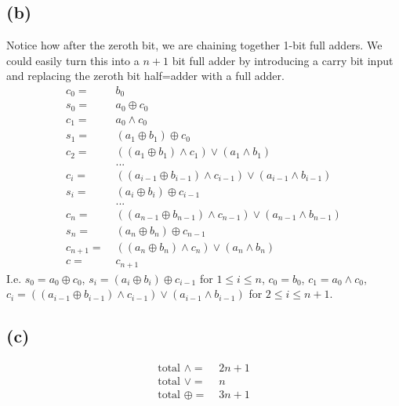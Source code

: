 \documentclass{article}
\begin{document}
\subsection{(b)}
Notice how after the zeroth bit, we are chaining together 1-bit full adders. We could easily turn this into a $n+1$ bit full adder by introducing a carry bit input and replacing the zeroth bit half=adder with a full adder.
\begin{align*}
	c_0 = \;     & b_0                                                                   \\
	s_0 = \;     & a_0 \oplus c_0                                                        \\
	c_1 = \;     & a_0 \land c_0                                                         \\
	s_1 = \;     & (a_1 \oplus b_1) \oplus c_0                                           \\
	c_2 = \;     & ((a_1 \oplus b_1) \land c_1) \lor (a_1 \land b_1)                     \\
	             & ...                                                                   \\
	c_i = \;     & ((a_{i-1} \oplus b_{i-1}) \land c_{i-1}) \lor (a_{i-1} \land b_{i-1}) \\
	s_i = \;     & (a_i \oplus b_i) \oplus c_{i-1}                                       \\
	             & ...                                                                   \\
	c_n = \;     & ((a_{n-1} \oplus b_{n-1}) \land c_{n-1}) \lor (a_{n-1} \land b_{n-1}) \\
	s_n  = \;    & (a_n \oplus b_n) \oplus c_{n-1}                                       \\
	c_{n+1} = \; & ((a_n \oplus b_n) \land c_n) \lor (a_n \land b_n)                     \\
	c = \;       & c_{n+1}
\end{align*}
I.e. $s_0 = a_0 \oplus c_0$, $s_i = (a_i \oplus b_i) \oplus c_{i-1}$ for $1 \leq i \leq n$, $c_0 = b_0$, $c_1 = a_0 \land c_0$, $c_i = ((a_{i-1} \oplus b_{i-1}) \land c_{i-1}) \lor (a_{i-1} \land b_{i-1})$ for $2 \leq i \leq n+1$.

\subsection{(c)}
\begin{align*}
	\text{total } \land = \;  & 2n + 1 \\
	\text{total } \lor = \;   & n      \\
	\text{total } \oplus = \; & 3n + 1
\end{align*}
\end{document}
